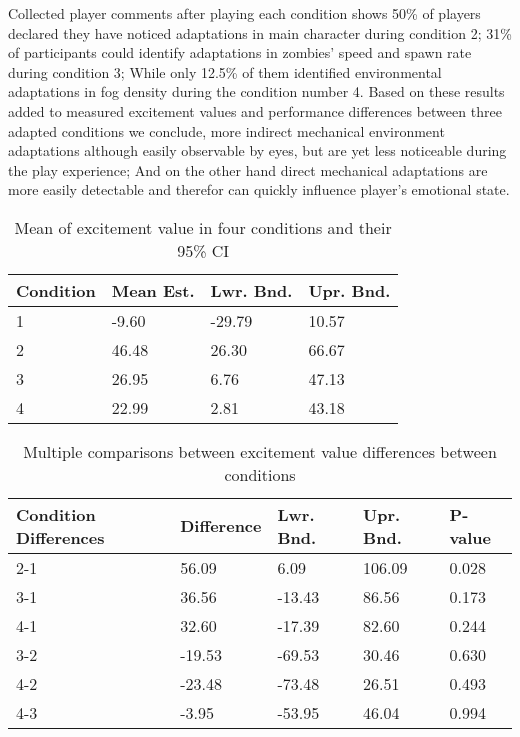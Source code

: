 \documentclass[conference]{IEEEtran}
\begin{document}
Collected player comments after playing each condition shows 50\% of players declared they have noticed adaptations in main character during condition 2; 31\% of participants could identify adaptations in zombies' speed and spawn rate during condition 3; While only 12.5\% of them identified environmental adaptations in fog density during the condition number 4. Based on these results added to measured excitement values and performance differences between three adapted conditions we conclude, more indirect mechanical environment adaptations although easily observable by eyes, but are yet less noticeable during the play experience; And on the other hand direct mechanical adaptations are more easily detectable and therefor can quickly influence player's emotional state.

\begin{table}[h]
\caption{Mean of excitement value in four conditions and their 95\% CI}
\label{tbl:mean-cnd-exct}
\centering
\begin{tabular}{llll}
\hline
Condition      &   Mean Est.      &   Lwr. Bnd.    &  Upr. Bnd.     \\
\hline
1              &   -9.60          &   -29.79       &  10.57         \\
2              &   46.48          &   26.30        &  66.67         \\
3              &   26.95          &   6.76         &  47.13         \\
4              &   22.99          &   2.81         &  43.18         \\
\hline
\end{tabular}
\end{table}

\begin{table}[h]
\caption{Multiple comparisons between excitement value differences between conditions}
\label{tbl:pval-cnd-exct}
\centering
\begin{tabular}{lllll}
\hline
Condition Differences &   Difference  &   Lwr. Bnd.      &     Upr. Bnd.   &  P-value     \\
\hline
2-1                   &    56.09      &       6.09       &     106.09      &  0.028       \\
3-1                   &    36.56      &     -13.43       &      86.56      &  0.173       \\
4-1                   &    32.60      &     -17.39       &      82.60      &  0.244       \\
3-2                   &   -19.53      &     -69.53       &      30.46      &  0.630       \\
4-2                   &   -23.48      &     -73.48       &      26.51      &  0.493       \\
4-3                   &    -3.95      &     -53.95       &      46.04      &  0.994       \\
\hline
\end{tabular}
\end{table}
\end{document}
